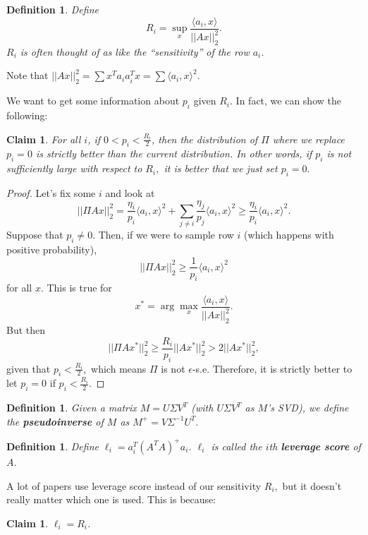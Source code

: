 \documentclass[11pt]{article}
\newtheorem{definition}[theorem]{Definition}
\newtheorem{claim}[theorem]{Claim}
\begin{document}
\begin{definition}
    Define $$R_i = \sup\limits_{x} \frac{\langle a_i, x\rangle}{||Ax||_2^2}.$$  $R_i$ is often thought of as like the ``sensitivity'' of the row $a_i$.
\end{definition}

Note that $||Ax||_2^2 = \sum x^T a_i a_i^T x = \sum \langle a_i, x \rangle^2.$

We want to get some information about $p_i$ given $R_i.$  In fact, we can show the following:

\begin{claim}
    For all $i$, if $0 < p_i < \frac{R_i}{2}$, then the distribution of $\Pi$ where we replace $p_i = 0$ is strictly better than the current distribution.  In other words, if $p_i$ is not sufficiently large with respect to $R_i,$ it is better that we just set $p_i = 0.$
\end{claim}

\begin{proof}
    Let's fix some $i$ and look at $$||\Pi A x||_2^2 = \frac{\eta_i}{p_i} \langle a_i, x\rangle^2 + \sum\limits_{j \neq i} \frac{\eta_j}{p_j} \langle a_i, x \rangle^2 \ge \frac{\eta_i}{p_i} \langle a_i, x\rangle^2.$$  Suppose that $p_i \neq 0.$  Then, if we were to sample row $i$ (which happens with positive probability), $$||\Pi A x||_2^2 \ge \frac{1}{p_i} \langle a_i, x \rangle^2$$ for all $x$.  This is true for $$x^* = \arg\max\limits_{x} \frac{\langle a_i, x \rangle}{||Ax||_2^2}.$$  But then $$||\Pi A x^*||_2^2 \ge \frac{R_i}{p_i} ||Ax^*||_2^2 > 2||Ax^*||_2^2,$$ given that $p_i < \frac{R_i}{2},$ which means $\Pi$ is not $\epsilon$-s.e.  Therefore, it is strictly better to let $p_i = 0$ if $p_i < \frac{R_i}{2}.$
\end{proof}

\begin{definition}
    Given a matrix $M = U \Sigma V^T$ (with $U \Sigma V^T$ as $M$'s SVD), we define the \textbf{pseudoinverse} of $M$ as $M^+ = V \Sigma^{-1} U^T.$
\end{definition}

\begin{definition}
    Define $\ell_i = a_i^T (A^T A)^+ a_i$.  $\ell_i$ is called the $i$th \textbf{leverage score} of $A$.
\end{definition}

A lot of papers use leverage score instead of our sensitivity $R_i,$ but it doesn't really matter which one is used.  This is because:

\begin{claim}
    $\ell_i = R_i$.
\end{claim}
\end{document}
